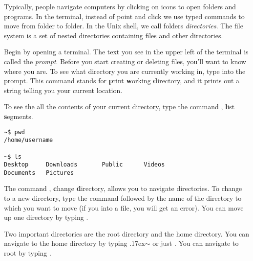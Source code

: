 Typically, people navigate computers by clicking on icons to open folders and programs.
In the terminal, instead of point and click we use typed commands to move from folder to folder. 
In the Unix shell, we call folders \emph{directories}.
The file system is a set of nested directories containing files and other directories. 

Begin by opening a terminal. 
The text you see in the upper left of the terminal is called the \emph{prompt}. 
Before you start creating or deleting files, you'll want to know where you are.
To see what directory you are currently working in, type  into the prompt.
This command stands for \textbf{p}rint \textbf{w}orking \textbf{d}irectory, and it prints out a string telling you your current location.

To see the all the contents of your current directory, type the command , \textbf{l}ist \textbf{s}egments.

\begin{lstlisting}
~$ pwd
/home/username

~$ ls
Desktop		Downloads		Public 		Videos	
Documents 	Pictures
\end{lstlisting}

The command , \textbf{c}hange \textbf{d}irectory, allows you to navigate directories.
To change to a new directory, type the  command followed by the name of the directory to which you want to move (if you  into a file, you will get an error).
You can move up one directory by typing .

Two important directories are the root directory and the home directory.
You can navigate to the home directory by typing  \raise.17ex\hbox{$\scriptstyle\sim$} or just .
You can navigate to root by typing .

